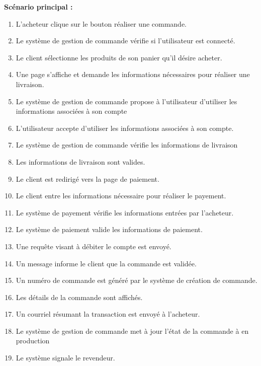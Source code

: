 \documentclass[16pt]{report}
\begin{document}
\textbf{Scénario principal :}
\begin{enumerate}[leftmargin=4em]
    \item L’acheteur clique sur le bouton réaliser une commande.
    \item Le système de gestion de commande vérifie si l’utilisateur est connecté.
    \item Le client sélectionne les produits de son panier qu’il désire acheter.
    \item Une page s’affiche et demande les informations nécessaires pour réaliser une livraison.
    \item Le système de gestion de commande propose à l’utilisateur d’utiliser les informations associées à son compte
    \item L’utilisateur accepte d’utiliser les informations associées à son compte.
    \item Le système de gestion de commande vérifie les informations de livraison
    \item Les informations de livraison sont valides.
    \item Le client est redirigé vers la page de paiement.
    \item Le client entre les informations nécessaire pour réaliser le payement.
    \item Le système de payement vérifie les informations entrées par l’acheteur.
    \item Le système de paiement valide les informations de paiement. 
    \item Une requête visant à débiter le compte est envoyé.
    \item Un message informe le client que la commande est validée.
    \item Un numéro de commande est généré par le système de création de commande.
    \item Les détails de la commande sont affichés.
    \item Un courriel résumant la transaction est envoyé à l’acheteur.
    \item Le système de gestion de commande met à jour l'état de la commande à en production 
    \item Le système signale le revendeur.
    \end{enumerate}
\end{document}
